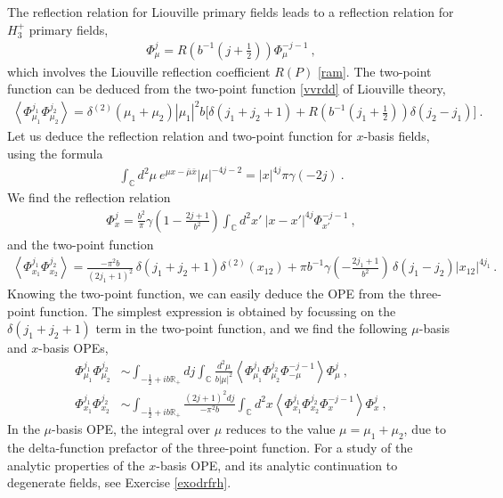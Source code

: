 \documentclass[12pt, a4paper, notitlepage, twoside]{report}
\numberwithin{equation}{section}
\theoremstyle{break}
\begin{document}
The reflection relation for Liouville primary fields leads to a reflection relation for $H_3^+$ primary fields,
\begin{align}
 \Phi^j_{\mu} = R\left(b^{-1}(j+\tfrac12)\right) \Phi^{-j-1}_{\mu} \ ,
\end{align}
which involves the Liouville reflection coefficient $R(P)$ \eqref{ram}. The two-point function can be deduced from the two-point function \eqref{vvrdd} of Liouville theory, 
\begin{align}
 \left\langle \Phi^{j_1}_{\mu_1} \Phi^{j_2}_{\mu_2}\right\rangle = \delta^{(2)}(\mu_1+\mu_2) |\mu_1|^2 b\Big[\delta(j_1+j_2+1) + R\left(b^{-1}(j_1+\tfrac12)\right) \delta(j_2-j_1)\Big]\ .
\end{align}
Let us deduce the reflection relation and two-point function for $x$-basis fields, using the formula  
\begin{align}
 \int_{{\mathbb{C}}}d^2\mu\ e^{\mu x-\bar{\mu}\bar{x}} |\mu|^{-4j-2} = |x|^{4j}\pi \gamma(-2j) \ .
\label{icmx}
\end{align}
We find the reflection relation 
\begin{align}
 \Phi^j_{x} = \frac{b^2}{\pi}\gamma(1-\tfrac{2j+1}{b^2})\int_{{\mathbb{C}}}d^2x'\ |x-x'|^{4j}\Phi^{-j-1}_{x'}\ ,
\end{align}
and the two-point function 
\begin{align}
 \left\langle \Phi^{j_1}_{x_1} \Phi^{j_2}_{x_2} \right\rangle = \frac{-\pi^2 b}{(2j_1+1)^2}\, \delta(j_1+j_2+1)\delta^{(2)}(x_{12}) 
+ \pi b^{-1} \gamma(-\tfrac{2j_1+1}{b^2})\, \delta(j_1-j_2)|x_{12}|^{4j_1}\, .
\label{pjpj}
\end{align}
Knowing the two-point function, we can easily deduce the OPE from the three-point function. 
The simplest expression is obtained by focussing on the $\delta(j_1+j_2+1)$ term in the two-point function, and we find the following $\mu$-basis and $x$-basis OPEs,
\begin{align}
\Phi^{j_1}_{\mu_1}\Phi^{j_2}_{\mu_2} &\sim  \int_{-\frac12 + ib\mathbb{R}_+} dj\int_{{\mathbb{C}}}\frac{d^2\mu}{b|\mu|^2} \left\langle \Phi^{j_1}_{\mu_1}\Phi^{j_2}_{\mu_2} \Phi^{-j-1}_{-\mu} \right\rangle \Phi^j_{\mu}\ , 
\label{mope}
\\
\Phi^{j_1}_{x_1}\Phi^{j_2}_{x_2} &\sim \int_{-\frac12 + ib\mathbb{R}_+} \frac{(2j+1)^2 dj}{-\pi^2b}\int_{{\mathbb{C}}}d^2x \left\langle \Phi^{j_1}_{x_1}\Phi^{j_2}_{x_2} \Phi^{-j-1}_{x} \right\rangle \Phi^j_{x}\ ,
\label{xope}
\end{align}
In the $\mu$-basis OPE, the integral over $\mu$ reduces to the value $\mu=\mu_1+\mu_2$, due to the delta-function prefactor of the three-point function. 
For a study of the analytic properties of the $x$-basis OPE, and its analytic continuation to degenerate fields, see Exercise \ref{exodrfrh}.
\end{document}
